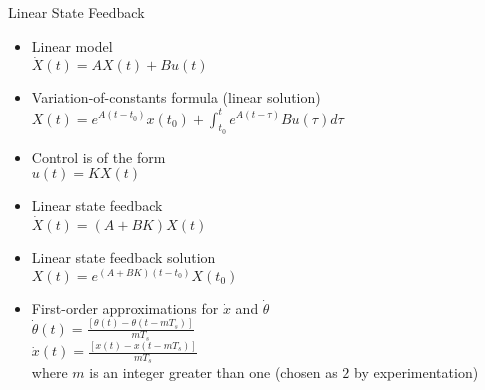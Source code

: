 \documentclass{beamer}
\begin{document}
\begin{frame}{Linear State Feedback}

\begin{itemize}
\pause \item Linear model \\$\dot{X}\left(t\right)=AX\left(t\right)+Bu\left(t\right)$
\pause \item Variation-of-constants formula (linear solution) \\ $X\left(t\right)=e^{A\left(t-t_0\right)}x\left(t_0\right)+\int_{t_0}^{t}e^{A\left(t-\tau\right)}Bu\left(\tau\right)d\tau$
\pause \item Control is of the form \\$u\left(t\right)=KX\left(t\right)$
\pause \item Linear state feedback \\ $\dot{X}\left(t\right)=\left(A+BK\right)X\left(t\right)$
\pause \item Linear state feedback solution \\ $X\left(t\right)=e^{\left(A+BK\right)\left(t-t_0\right)}X\left(t_0\right)$
\pause \item First-order approximations for $\dot{x}$ and $\dot{\theta}$\\
$\dot{\theta}(t)=\frac{[\theta(t)-\theta(t-mT_s)]}{mT_s}$\\
$\dot{x}(t)=\frac{[x(t)-x(t-mT_s)]}{mT_s}$\\
where $m$ is an integer greater than one (chosen as $2$ by experimentation)
\end{itemize}

\end{frame}
\end{document}
